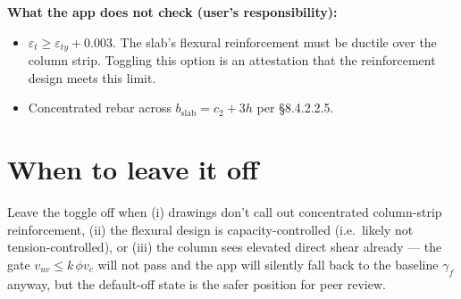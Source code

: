 \documentclass[10pt]{article}
\begin{document}
\textbf{What the app does not check (user's responsibility):}
\begin{itemize}
\item $\varepsilon_t \geq \varepsilon_{ty} + 0.003$. The slab's flexural reinforcement must be ductile over the column strip. Toggling this option is an attestation that the reinforcement design meets this limit.
\item Concentrated rebar across $b_{\text{slab}} = c_2 + 3h$ per \S 8.4.2.2.5.
\end{itemize}

\section*{When to leave it off}
Leave the toggle off when (i) drawings don't call out concentrated column-strip reinforcement, (ii) the flexural design is capacity-controlled (i.e.\ likely not tension-controlled), or (iii) the column sees elevated direct shear already --- the gate $v_{uv} \leq k\,\phi v_c$ will not pass and the app will silently fall back to the baseline $\gamma_f$ anyway, but the default-off state is the safer position for peer review.
\end{document}

